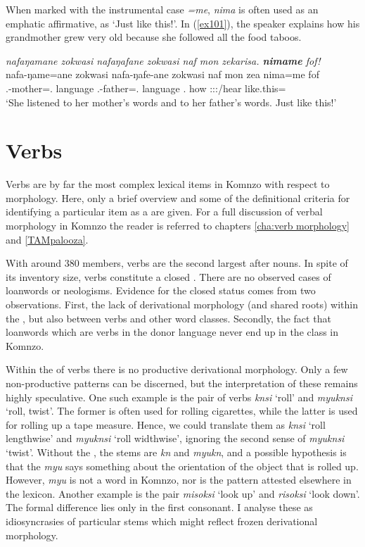 When marked with the instrumental case \emph{=me}, \emph{nima} is often used as an emphatic affirmative, as  `Just like this!'. In (\ref{ex101}), the speaker explains how his grandmother grew very old because she followed all the food taboos.

\begin{exe}
	\ex \emph{nafaŋamane zokwasi nafaŋafane zokwasi naf mon zekarisa. \textbf{nimame} fof!}\\
	\gll nafa-ŋame=ane zokwasi nafa-ŋafe-ane zokwasi naf mon zea nima=me fof\\
	\Third.{\Poss}-mother=\Poss.{\Sg} language \Third.{\Poss}-father=\Poss.{\Sg} language \Tsg.{\Erg} how \Stsg:\Sbj:\Pst:\Pfv/hear {like.this}={\Ins} {\Emph}\\
	\trans `She listened to her mother's words and to her father's words. Just like this!' 
	\label{ex101}
\end{exe}

\section{Verbs} \label{verbs-sec}

Verbs are by far the most complex lexical items in Komnzo with respect to morphology. Here, only a brief overview and some of the definitional criteria for identifying a particular item as a  are given. For a full discussion of verbal morphology in Komnzo the reader is referred to chapters \ref{cha:verb morphology} and \ref{TAMpalooza}.

With around 380 members, verbs are the second largest  after nouns. In spite of its inventory size, verbs constitute a closed . There are no observed cases of loanwords or neologisms. Evidence for the closed status comes from two observations. First, the lack of derivational morphology (and shared roots) within the , but also between verbs and other word classes. Secondly, the fact that loanwords which are verbs in the donor language never end up in the  class in Komnzo.

Within the  of verbs there is no productive derivational morphology. Only a few non-productive patterns can be discerned, but the interpretation of these remains highly speculative. One such example is the pair of verbs \emph{knsi} `roll' and \emph{myuknsi} `roll, twist'. The former is often used for rolling cigarettes, while the latter is used for rolling up a tape measure. Hence, we could translate them as \emph{knsi} `roll lengthwise' and \emph{myuknsi} `roll widthwise', ignoring the second sense of \emph{myuknsi} `twist'. Without the , the stems are \emph{kn} and \emph{myukn}, and a possible hypothesis is that the \emph{myu} says something about the orientation of the object that is rolled up. However, \emph{myu} is not a word in Komnzo, nor is the pattern attested elsewhere in the  lexicon. Another example is the pair \emph{misoksi} `look up' and \emph{risoksi} `look down'. The formal difference lies only in the first consonant. I analyse these as idiosyncrasies of particular stems which might reflect frozen derivational morphology.

